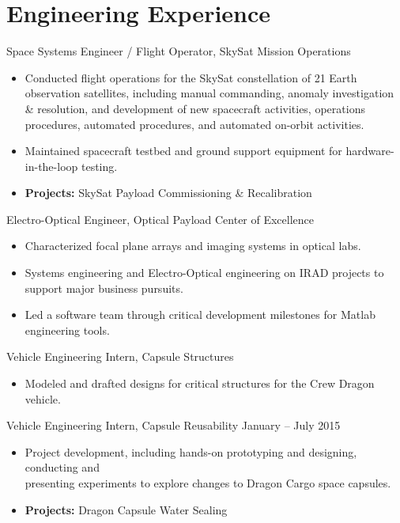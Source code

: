 \documentclass[10pt,final,sans]{resume}
\begin{document}
\section{Engineering Experience}

Space Systems Engineer / Flight Operator, SkySat Mission Operations
\begin{itemize}
  \item Conducted flight operations for the SkySat constellation of 21 Earth 
  observation satellites, including manual commanding, anomaly investigation \&
  resolution, and development of new spacecraft activities, operations 
  procedures, automated procedures, and automated on-orbit activities.
  \item Maintained spacecraft testbed and ground support equipment for
  hardware-in-the-loop testing.
  \item {\bf Projects:} SkySat Payload Commissioning \& Recalibration
\end{itemize}

Electro-Optical Engineer, Optical Payload Center of Excellence
\begin{itemize}
  \item Characterized focal plane arrays and imaging systems in optical labs.
  \item Systems engineering and Electro-Optical engineering on IRAD projects to
  support major business pursuits.
  \item Led a software team through critical development milestones for Matlab
  engineering tools.
\end{itemize} 
Vehicle Engineering Intern, Capsule Structures
\begin{itemize}
  \item Modeled and drafted designs for critical structures for the Crew Dragon
  vehicle.
\end{itemize}

Vehicle Engineering Intern, Capsule Reusability \hfill January -- July 2015
\begin{itemize}
  \item Project development, including hands-on prototyping and designing,
  conducting and \\
  presenting experiments to explore changes to Dragon Cargo space capsules.
  \item {\bf Projects:} Dragon Capsule Water Sealing
\end{itemize}
\end{document}
